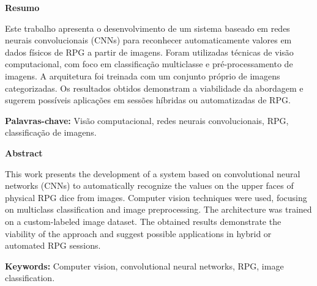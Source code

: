 \documentclass[12pt]{article}
\begin{document}
\begin{center}
    \Large\textbf{Resumo}
\end{center}

\noindent
Este trabalho apresenta o desenvolvimento de um sistema baseado em redes neurais convolucionais (CNNs) para 
reconhecer automaticamente valores em dados físicos de RPG a partir de imagens. Foram utilizadas técnicas 
de visão computacional, com foco em classificação multiclasse e pré-processamento de imagens. A arquitetura 
foi treinada com um conjunto próprio de imagens categorizadas. Os resultados obtidos demonstram a viabilidade 
da abordagem e sugerem possíveis aplicações em sessões híbridas ou automatizadas de RPG.

\vspace{0.5em}
\noindent
\textbf{Palavras-chave:} Visão computacional, redes neurais convolucionais, RPG, classificação de imagens.
\newpage

\begin{center}
    \Large\textbf{Abstract}
\end{center}

\noindent
This work presents the development of a system based on convolutional neural networks (CNNs) to automatically recognize the values on the upper faces of physical RPG dice from images. Computer vision techniques were used, focusing on multiclass classification and image preprocessing. The architecture was trained on a custom-labeled image dataset. The obtained results demonstrate the viability of the approach and suggest possible applications in hybrid or automated RPG sessions.

\vspace{0.5em}
\noindent
\textbf{Keywords:} Computer vision, convolutional neural networks, RPG, image classification.
\newpage

\begin{center}
\listoffigures
\newpage
\tableofcontents
\newpage
\end{center}









\end{document}
